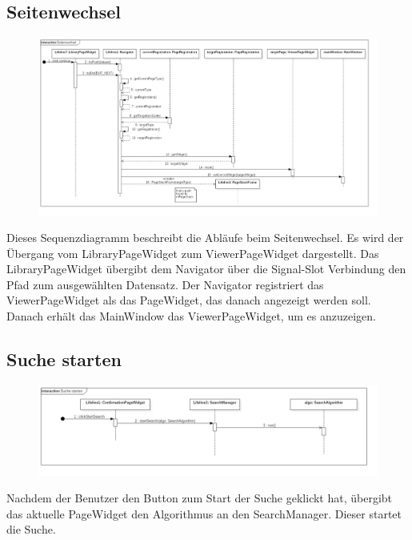 \subsection{Seitenwechsel}

\begin{figure}[H]
\centering
\includegraphics[width=\linewidth]{img/Sequenzdiagramme/Seitenwechsel}
\label{fig:seitenwechsel}
\end{figure}

Dieses Sequenzdiagramm beschreibt die Abläufe beim Seitenwechsel. Es wird der Übergang vom LibraryPageWidget zum ViewerPageWidget dargestellt. Das LibraryPageWidget übergibt dem Navigator über die Signal-Slot Verbindung den Pfad zum ausgewählten Datensatz. Der Navigator registriert das ViewerPageWidget als das PageWidget, das danach angezeigt werden soll. Danach erhält das MainWindow das ViewerPageWidget, um es anzuzeigen.

\pagebreak

\subsection{Suche starten}

\begin{figure}[H]
\centering
\includegraphics[width=\linewidth]{img/Sequenzdiagramme/SucheStarten}
\label{fig:sucheStarten}
\end{figure}
Nachdem der Benutzer den Button zum Start der Suche geklickt hat, übergibt das aktuelle PageWidget den Algorithmus an den SearchManager. Dieser startet die Suche.

